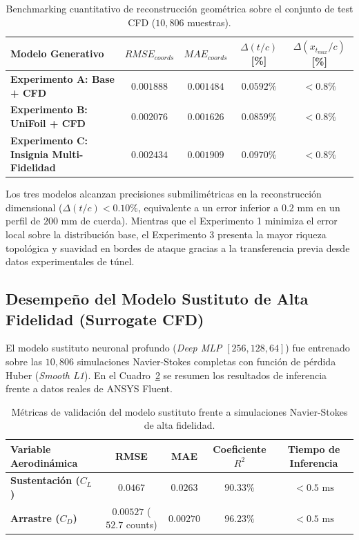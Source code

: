 \begin{table}[htbp]
\centering
\caption{Benchmarking cuantitativo de reconstrucción geométrica sobre el conjunto de test CFD ($10{,}806$ muestras).}
\label{tab:cvae_benchmark_cfd}
\small
\begin{tabular}{lcccc}
\toprule
\textbf{Modelo Generativo} & \textbf{$RMSE_{coords}$} & \textbf{$MAE_{coords}$} & \textbf{$\Delta(t/c)$ [\%]} & \textbf{$\Delta(x_{t_{max}}/c)$ [\%]} \\
\midrule
\textbf{Experimento A: Base + CFD} & $0.001888$ & $0.001484$ & $\mathbf{0.0592\%}$ & $< 0.8\%$ \\
\textbf{Experimento B: UniFoil + CFD} & $0.002076$ & $0.001626$ & $0.0859\%$ & $< 0.8\%$ \\
\textbf{Experimento C: Insignia Multi-Fidelidad} & $0.002434$ & $0.001909$ & $0.0970\%$ & $< 0.8\%$ \\
\bottomrule
\end{tabular}
\end{table}

Los tres modelos alcanzan precisiones submilimétricas en la reconstrucción dimensional ($\Delta(t/c) < 0.10\%$, equivalente a un error inferior a $0.2\text{ mm}$ en un perfil de $200\text{ mm}$ de cuerda). Mientras que el Experimento 1 minimiza el error local sobre la distribución base, el Experimento 3 presenta la mayor riqueza topológica y suavidad en bordes de ataque gracias a la transferencia previa desde datos experimentales de túnel.

\subsection{Desempeño del Modelo Sustituto de Alta Fidelidad (Surrogate CFD)}
El modelo sustituto neuronal profundo (\textit{Deep MLP} $[256, 128, 64]$) fue entrenado sobre las $10{,}806$ simulaciones Navier-Stokes completas con función de pérdida Huber (\textit{Smooth L1}). En el Cuadro~\ref{tab:surrogate_performance} se resumen los resultados de inferencia frente a datos reales de ANSYS Fluent.

\begin{table}[htbp]
\centering
\caption{Métricas de validación del modelo sustituto frente a simulaciones Navier-Stokes de alta fidelidad.}
\label{tab:surrogate_performance}
\small
\begin{tabular}{lcccc}
\toprule
\textbf{Variable Aerodinámica} & \textbf{RMSE} & \textbf{MAE} & \textbf{Coeficiente $R^2$} & \textbf{Tiempo de Inferencia} \\
\midrule
\textbf{Sustentación ($C_L$)} & $0.0467$ & $0.0263$ & $\mathbf{90.33\%}$ & $< 0.5\text{ ms}$ \\
\textbf{Arrastre ($C_D$)} & $0.00527$ ($52.7$ counts) & $0.00270$ & $\mathbf{96.23\%}$ & $< 0.5\text{ ms}$ \\
\bottomrule
\end{tabular}
\end{table}

